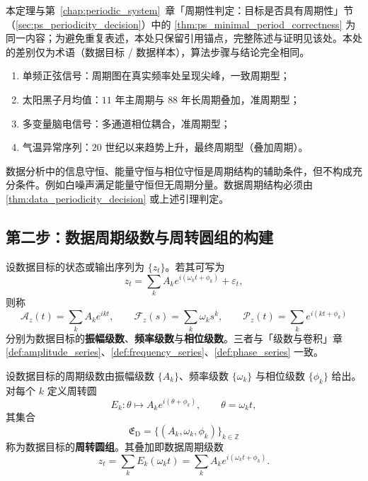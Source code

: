 \begin{theorem}[数据最小正周期算法的正确性]\label{thm:data_minimal_period_correctness}
本定理与第~\ref{chap:periodic_system}~章「周期性判定：目标是否具有周期性」节（\cref{sec:ps_periodicity_decision}）中的 \cref{thm:ps_minimal_period_correctness} 为同一内容；为避免重复表述，本处只保留引用锚点，完整陈述与证明见该处。本处的差别仅为术语（数据目标 / 数据样本），算法步骤与结论完全相同。
\end{theorem}

\begin{example}[数据周期判定实例]\label{ex:data_periodic_examples}
\begin{enumerate}[label=(\roman*)]
    \item 单频正弦信号：周期图在真实频率处呈现尖峰，一致周期型；
    \item 太阳黑子月均值：$11$ 年主周期与 $88$ 年长周期叠加，准周期型；
    \item 多变量脑电信号：多通道相位耦合，准周期型；
    \item 气温异常序列：$20$ 世纪以来趋势上升，最终周期型（叠加周期）。
\end{enumerate}
\end{example}

\begin{remark}[守恒量不保证周期]\label{rem:data_invariant_not_period}
数据分析中的信息守恒、能量守恒与相位守恒是周期结构的辅助条件，但不构成充分条件。例如白噪声满足能量守恒但无周期分量。数据周期结构必须由 \cref{thm:data_periodicity_decision} 或上述引理判定。
\end{remark}

\subsection{第二步：数据周期级数与周转圆组的构建}

\begin{definition}\label{def:data_series}
设数据目标的状态或输出序列为 $\{z_t\}$。若其可写为
\[
z_t=\sum_k A_k e^{i(\omega_k t+\phi_k)}+\varepsilon_t,
\]
则称
\[
\mathcal A_z(t)=\sum_k A_k e^{ikt},\qquad
\mathcal F_z(s)=\sum_k \omega_k s^k,\qquad
\mathcal P_z(t)=\sum_k e^{i(kt+\phi_k)}
\]
分别为数据目标的\textbf{振幅级数}、\textbf{频率级数}与\textbf{相位级数}。三者与「级数与卷积」章 \cref{def:amplitude_series}、\cref{def:frequency_series}、\cref{def:phase_series} 一致。
\end{definition}

\begin{definition}[数据周转圆组]\label{def:data_epicycle_group}
设数据目标的周期级数由振幅级数 $\{A_k\}$、频率级数 $\{\omega_k\}$ 与相位级数 $\{\phi_k\}$ 给出。对每个 $k$ 定义周转圆
\[
E_k:\theta\mapsto A_k e^{i(\theta+\phi_k)},\qquad \theta=\omega_k t,
\]
其集合
\[
\mathfrak E_{\mathrm{D}}=\{(A_k,\omega_k,\phi_k)\}_{k\in\mathbb Z}
\]
称为数据目标的\textbf{周转圆组}。其叠加即数据周期级数
\[
z_t=\sum_k E_k(\omega_k t)=\sum_k A_k e^{i(\omega_k t+\phi_k)}.
\]
\end{definition}


